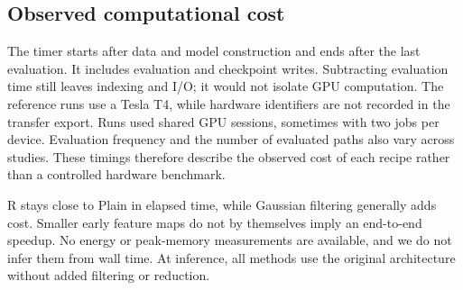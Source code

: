 \subsection{Observed computational cost}
\label{app:cost}

The timer starts after data and model construction and ends after the last evaluation. It includes evaluation and checkpoint writes. Subtracting evaluation time still leaves indexing and I/O; it would not isolate GPU computation. The reference runs use a Tesla T4, while hardware identifiers are not recorded in the transfer export. Runs used shared GPU sessions, sometimes with two jobs per device. Evaluation frequency and the number of evaluated paths also vary across studies. These timings therefore describe the observed cost of each recipe rather than a controlled hardware benchmark.

R stays close to Plain in elapsed time, while Gaussian filtering generally adds cost. Smaller early feature maps do not by themselves imply an end-to-end speedup. No energy or peak-memory measurements are available, and we do not infer them from wall time. At inference, all methods use the original architecture without added filtering or reduction.
